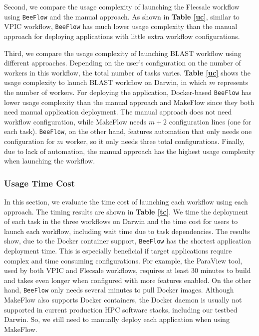 Second, we compare the usage complexity of launching the Flecsale workflow using \texttt{BeeFlow} and the manual approach. As shown in \textbf{Table \ref{uc}}, similar to VPIC workflow, \texttt{BeeFlow} has much lower usage complexity than the manual approach for deploying applications with little extra workflow configurations.

Third, we compare the usage complexity of launching BLAST workflow using different approaches. Depending on the user's configuration on the number of workers in this workflow, the total number of tasks varies. \textbf{Table \ref{uc}} shows the usage complexity to launch BLAST workflow on Darwin, in which $m$ represents the number of workers. For deploying the application, Docker-based \texttt{BeeFlow} has lower usage complexity than the manual approach and MakeFlow since they both need manual application deployment. The manual approach does not need workflow configuration, while MakeFlow needs $m+2$ configuration lines (one for each task). \texttt{BeeFlow}, on the other hand, features automation that only needs one configuration for $m$ worker, so it only needs three total configurations. Finally, due to lack of automation, the manual approach has the highest usage complexity when launching the workflow.


\subsubsection{Usage Time Cost}

In this section, we evaluate the time cost of launching each workflow using each approach. The timing results are shown in \textbf{Table \ref{tc}}. We time the deployment of each task in the three workflows on Darwin and the time cost for users to launch each workflow, including wait time due to task dependencies.  The results show, due to the Docker container support, \texttt{BeeFlow} has the shortest application deployment time. This is especially beneficial if target applications require complex and time consuming configurations. For example, the ParaView tool, used by both VPIC and Flecsale workflows, requires at least 30 minutes to build and takes even longer when configured with more features enabled. On the other hand, \texttt{BeeFlow} only needs several minutes to pull Docker images. Although MakeFlow also supports Docker containers, the Docker daemon is usually not supported in current production HPC software stacks, including our testbed Darwin. So, we still need to manually deploy each application when using MakeFlow. 

